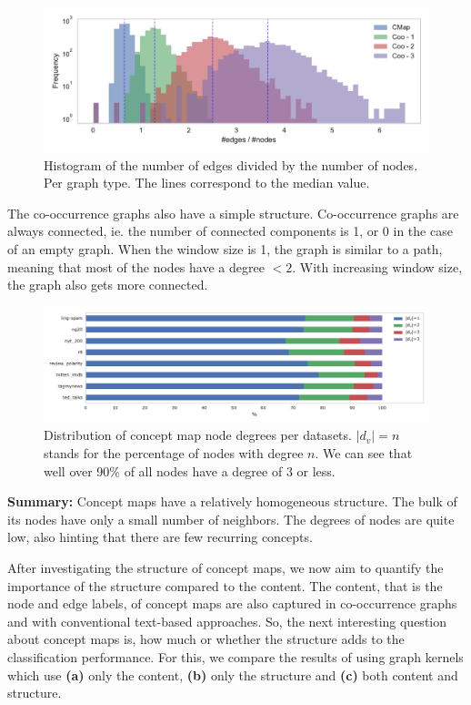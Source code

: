 \begin{figure}[htb!]
\centering
\includegraphics[width=0.7\linewidth]{assets/figures/hist-edgesnodes.pdf}
\caption[Statistics: Histogram of the number of edges divided by the number of nodes]{Histogram of the number of edges divided by the number of nodes. Per graph type. The lines correspond to the median value.}
\label{fig:histogram-edges-div-nodes-per-type}
\end{figure}

The co-occurrence graphs also have a simple structure.
Co-occurrence graphs are always connected, ie. the number of connected components is 1, or 0 in the case of an empty graph.
When the window size is 1, the graph is similar to a path, meaning that most of the nodes have a degree $< 2$. With increasing window size, the graph also gets more connected.

\begin{figure}[htb!]
	\centering
	{\includegraphics[width=\linewidth]{assets/figures/percentage_degree.pdf}%
		\caption[Statistics: Distribution of concept map node degrees]{%
			Distribution of concept map node degrees per datasets. $|d_v| = n$ stands for the percentage of nodes with degree $n$.
			We can see that well over 90\% of all nodes have a degree of $3$ or less.
		}%
		\label{fig:percentage_degree}}
\end{figure}


\textbf{Summary:}
Concept maps have a relatively homogeneous structure.
The bulk of its nodes have only a small number of neighbors.
The degrees of nodes are quite low, also hinting that there are few recurring concepts.

After investigating the structure of concept maps, we now aim to quantify the importance of the structure compared to the content.
The content, that is the node and edge labels, of concept maps are also captured in co-occurrence graphs and with conventional text-based approaches. So, the next interesting question about concept maps is, how much or whether the structure adds to the classification performance.
For this, we compare the results of using graph kernels which use \textbf{(a)} only the content, \textbf{(b)} only the structure and \textbf{(c)} both content and structure.

